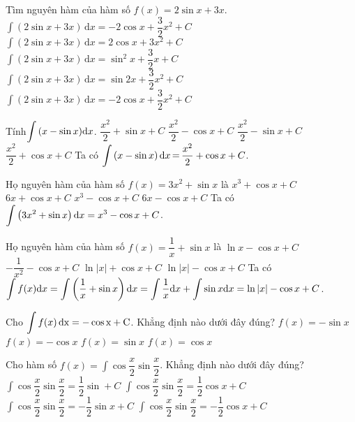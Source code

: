 \begin{ex}%
	Tìm nguyên hàm của hàm số $f(x)=2\sin x+3x$.
	\choice
	{\True $\displaystyle\int{\left(2\sin x+3x\right)\mathrm{\,d}x=-2\cos x+\dfrac{3}{2}{x^2}+C}$}
	{$\displaystyle\int{\left(2\sin x+3x\right)\mathrm{\,d}x=2\cos x+3x^2+C}$}
	{$\displaystyle\int{\left(2\sin x+3x\right)\mathrm{\,d}x=\sin^2x+\dfrac{3}{2}x+C}$}
	{$\displaystyle\int{\left(2\sin x+3x\right)\mathrm{\,d}x=\sin 2x+\dfrac{3}{2}{x^2}+C}$}
	\loigiai
	{
		$\displaystyle\int{\left(2\sin x+3x\right)\mathrm{\,d}x}=-2\cos x+\dfrac{3}{2}{x^2}+C$}
\end{ex}

\begin{ex}%
	Tính$\displaystyle\int{\left(x-\sin x\right)}{\rm{d}}x$.
	\choice
	{$\dfrac{x^2}{2}+\sin x+C$}
	{$\dfrac{x^2}{2}-\cos x+C$}
	{$\dfrac{x^2}{2}-\sin x+C$}
	{\True $\dfrac{x^2}{2}+\cos x+C$}
	\loigiai
	{
		Ta có $\displaystyle\int{\left(x-\sin x\right){\rm{d}}x\,\rm{=}\,}\dfrac{x^2}{2}+\cos x+C$.}
\end{ex}
\begin{ex}%
	Họ nguyên hàm của hàm số $f(x)=3x^2+\sin x$ là
	\choice
	{$x^3+\cos x+C$}
	{$6x+\cos x+C$}
	{\True $x^3-\cos x+C$}
	{$6x-\cos x+C$}
	\loigiai
	{
		Ta có $\displaystyle\int\left(3x^2+\sin x\right){\rm{d}}x=x^3-\cos x+C$.}
\end{ex}
\begin{ex}%
	Họ nguyên hàm của hàm số $ f(x)=\dfrac{1}{x}+\sin x$ là
	\choice
	{$\ln x-\cos x+C$}
	{$-\dfrac{1}{x^2}-\cos x+C$}
	{$\ln\left| x\right|+\cos x+C$}
	{\True $\ln\left| x\right|-\cos x+C$}
	\loigiai
	{
		Ta có $\displaystyle\int{f(x){\rm{d}}x}=\displaystyle\int{\left(\dfrac{1}{x}+\sin x\right){\rm{d}}x}=\displaystyle\int{\dfrac{1}{x}{\rm{d}}x}+\displaystyle\int{\sin x{\rm{d}}x}=\ln\left| x\right|-\cos x+C$.}
\end{ex}
\begin{ex}%
	Cho $\displaystyle\int{f(x)}\,\rm{d}x=-\cos x+C$. Khẳng định nào dưới đây đúng?
	\choice
	{$ f(x)=-\sin x$}
	{$ f(x)=-\cos x$}
	{\True $ f(x)=\sin x$}
	{$ f(x)=\cos x$}
\end{ex}
\begin{ex}%
	Cho hàm số $ f(x)=\displaystyle\int{\cos\dfrac{x}{2}\sin\dfrac{x}{2}}$. Khẳng định nào dưới đây đúng?
	\choice
	{$\displaystyle\int{\cos\dfrac{x}{2}\sin\dfrac{x}{2}}=\dfrac{1}{2}\sin+C$}
	{$\displaystyle\int{\cos\dfrac{x}{2}\sin\dfrac{x}{2}}=\dfrac{1}{2}\cos x+C$}
	{$\displaystyle\int{\cos\dfrac{x}{2}\sin\dfrac{x}{2}}=-\dfrac{1}{2}\sin x+C$}
	{\True $\displaystyle\int{\cos\dfrac{x}{2}\sin\dfrac{x}{2}}=-\dfrac{1}{2}\cos x+C$}
\end{ex}

